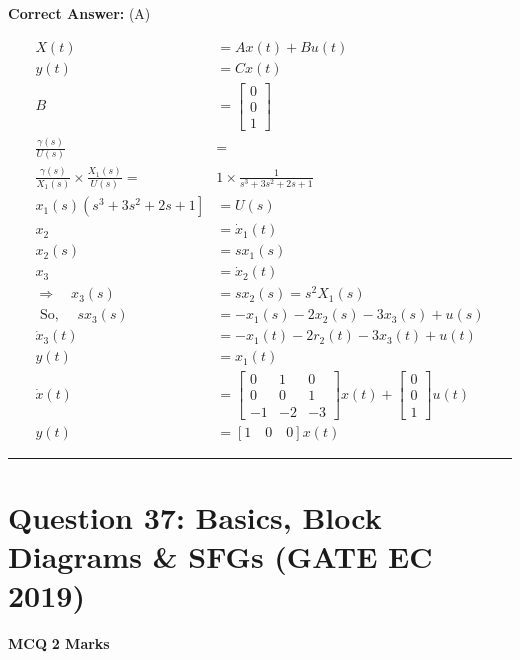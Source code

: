 \documentclass[11pt,a4paper]{article}
\begin{document}
\noindent \textbf{Correct Answer:} (A)

\begin{tcolorbox}[solbox, title=Detailed Solution -- Question 36]
\[
\begin{aligned} X(t) &=A x(t)+B u(t) \\ y(t) &=C x(t) \\ B &=\left[\begin{array}{l} 0 \\ 0 \\ 1 \end{array}\right] \\ \frac{\gamma(s)}{U(s)} &=\\ \frac{\gamma(s)}{X_{1}(s)} \times \frac{X_{1}(s)}{U(s)}=& 1 \times \frac{1}{s^{3}+3 s^{2}+2 s+1} \\ x_{1}(s)\left(s^{3}+3 s^{2}+2 s+1\right]&=U(s) \\ x_{2} &=\dot{x}_{1}(t) \\ x_{2}(s) &=s x_{1}(s) \\ x_{3} &=\dot{x}_{2}(t) \\ \Rightarrow \quad x_{3}(s) &=s x_{2}(s)=s^{2} X_{1}(s) \\ \text { So, } \quad s x_{3}(s) &=-x_{1}(s)-2 x_{2}(s)-3 x_{3}(s)+u(s) \\ \dot{x}_{3}(t) &=-x_{1}(t)-2 r_{2}(t)-3 x_{3}(t)+u(t) \\ y(t) &=x_{1}(t) \\ \dot{x}(t) &=\left[\begin{array}{ccc}0 & 1 & 0 \\ 0 & 0 & 1 \\ -1 & -2 & -3\end{array}\right] x(t)+\left[\begin{array}{l}0 \\ 0 \\ 1\end{array}\right] u(t) \\ y(t) &=[1 \quad 0 \quad 0] x(t) \end{aligned}
\]
\end{tcolorbox}

\vspace{1.5em}
\hrule
\vspace{1.5em}

\section*{Question 37: Basics, Block Diagrams \& SFGs (GATE EC 2019)}
\noindent \textbf{\color{primary}MCQ} \hfill \textbf{\color{secondary}2 Marks}
\end{document}

